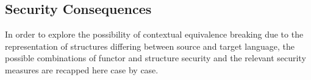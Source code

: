 




\subsection{Security Consequences}

In order to explore the possibility of contextual equivalence breaking due to the representation of structures differing between source and target language, the possible combinations of functor and structure security and the relevant security measures are recapped here case by case.

